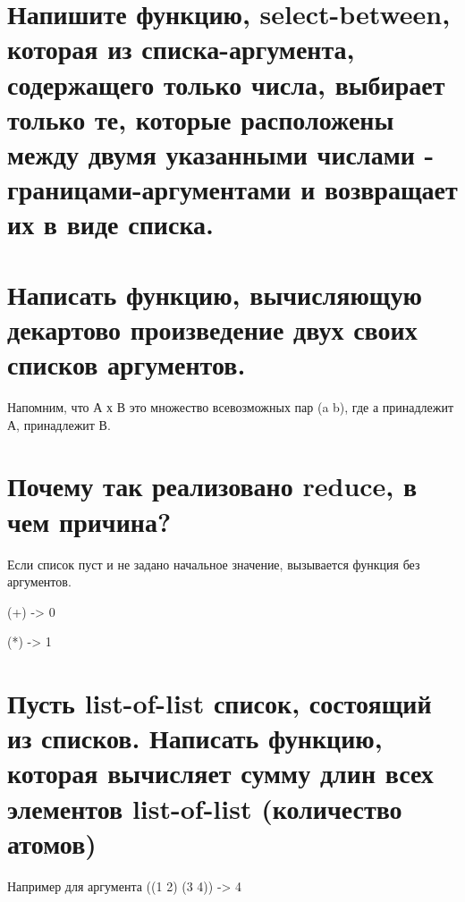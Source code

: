 \documentclass[a4paper, 14pt, unknownkeysallowed]{extreport}
\begin{document}
\section{Напишите функцию, select-between, которая из списка-аргумента, содержащего только
	числа, выбирает только те, которые расположены между двумя указанными числами - 
	границами-аргументами и возвращает их в виде списка.}


\section{Написать функцию, вычисляющую декартово произведение двух своих списков аргументов.}
Напомним, что А х В это множество всевозможных пар (a b), где а принадлежит А, принадлежит В.


\section{Почему так реализовано reduce, в чем причина?}


Если список пуст и не задано начальное значение, вызывается функция без аргументов. 

(+) -> 0

(*) -> 1

\section{ Пусть list-of-list список, состоящий из списков. Написать функцию, которая 
	вычисляет сумму длин всех элементов list-of-list (количество атомов)}
Например 
для аргумента
((1 2) (3 4)) -> 4

\end{document}
